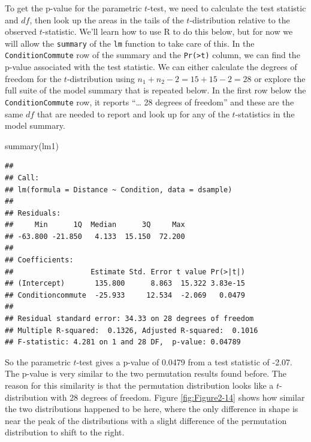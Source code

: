 \documentclass[
]{book}
\newenvironment{Shaded}{\begin{snugshade}}{\end{snugshade}}
\newcommand{\FunctionTok}[1]{\textcolor[rgb]{0.00,0.00,0.00}{#1}}
\newcommand{\NormalTok}[1]{#1}
\begin{document}
\indent To get the p-value for the parametric \(t\)-test,
we need to calculate the
test statistic and \(df\), then look up the areas in the tails of the
\(t\)-distribution
relative to the observed \(t\)-statistic. We'll learn how to use
R to do this below, but for now we will allow the \texttt{summary} of the \texttt{lm} function to take
care of this. In the \texttt{ConditionCommute} row of the summary and the \texttt{Pr(\textgreater{}\textbar{}t\textbar{})} column, we can find the p-value associated with the test statistic. We can either calculate the degrees of freedom for the \(t\)-distribution using \(n_1+n_2-2 = 15+15-2 = 28\) or explore the full suite of the model summary that is repeated below. In the first row below the \texttt{ConditionCommute} row, it reports ``\ldots{} 28 degrees of freedom'' and these are the same \(df\) that are needed to report and look up for any of the \(t\)-statistics in the model summary.

\begin{Shaded}
\begin{Highlighting}[]
\FunctionTok{summary}\NormalTok{(lm1)}
\end{Highlighting}
\end{Shaded}

\begin{verbatim}
## 
## Call:
## lm(formula = Distance ~ Condition, data = dsample)
## 
## Residuals:
##     Min      1Q  Median      3Q     Max 
## -63.800 -21.850   4.133  15.150  72.200 
## 
## Coefficients:
##                  Estimate Std. Error t value Pr(>|t|)
## (Intercept)       135.800      8.863  15.322 3.83e-15
## Conditioncommute  -25.933     12.534  -2.069   0.0479
## 
## Residual standard error: 34.33 on 28 degrees of freedom
## Multiple R-squared:  0.1326, Adjusted R-squared:  0.1016 
## F-statistic: 4.281 on 1 and 28 DF,  p-value: 0.04789
\end{verbatim}

So the parametric \(t\)-test gives a p-value of 0.0479 from a test statistic of
-2.07. The p-value is very similar to the two permutation results found before. The
reason for this similarity is that the permutation distribution looks like a \(t\)-distribution with 28 degrees
of freedom. Figure \ref{fig:Figure2-14} shows how similar the two distributions
happened to be here, where the only difference in shape is near the peak of the distributions with a slight difference of the permutation distribution to shift to the right.
\end{document}

